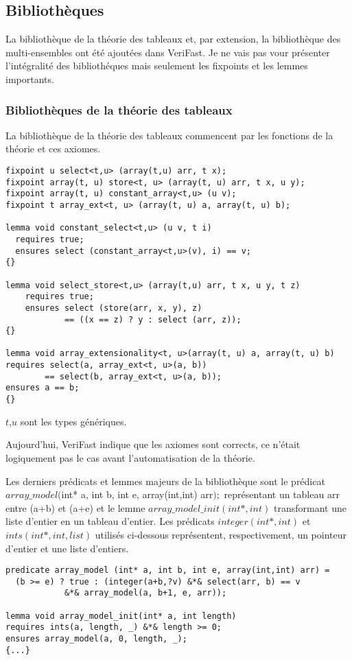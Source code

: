 \documentclass[11pt,openany]{article}
\newcommand{\verifast}{VeriFast}
\begin{document}
	\subsection{Biblioth\`eques}
		La biblioth\`eque de la th\'eorie des tableaux et, par extension, la biblioth\`eque des multi-ensembles ont \'et\'e ajout\'ees dans \verifast. Je ne vais pas vour pr\'esenter l'int\'egralit\'e des biblioth\'eques mais seulement les fixpoints et les lemmes importants.
		\subsubsection{Biblioth\`eques de la th\'eorie des tableaux}
			La biblioth\`eque de la th\'eorie des tableaux commencent par les fonctions de la th\'eorie et ces axiomes.
			\begin{lstlisting}
fixpoint u select<t,u> (array(t,u) arr, t x);
fixpoint array(t, u) store<t, u> (array(t, u) arr, t x, u y);
fixpoint array(t, u) constant_array<t,u> (u v);
fixpoint t array_ext<t, u> (array(t, u) a, array(t, u) b);

lemma void constant_select<t,u> (u v, t i)
  requires true;
  ensures select (constant_array<t,u>(v), i) == v;
{}

lemma void select_store<t,u> (array(t,u) arr, t x, u y, t z)
    requires true;
    ensures select (store(arr, x, y), z) 
    		== ((x == z) ? y : select (arr, z));
{}

lemma void array_extensionality<t, u>(array(t, u) a, array(t, u) b)
requires select(a, array_ext<t, u>(a, b)) 
		== select(b, array_ext<t, u>(a, b));
ensures a == b;
{}
			\end{lstlisting}
			$t$,$u$ sont les types g\'en\'eriques.
			
			Aujourd'hui, \verifast{} indique que les axiomes sont corrects, ce n'\'etait logiquement pas le cas avant l'automatisation de la th\'eorie.
			
			Les derniers pr\'edicats et lemmes majeurs de la biblioth\`eque sont le pr\'edicat $array\_model($int* a, int b, int e, array(int,int) arr$);$ repr\'esentant un tableau arr entre (a+b) et (a+e) et le lemme $array\_model\_init(int*,int)$ transformant une liste d'entier en un tableau d'entier. Les pr\'edicats $integer(int*,int)$ et $ints(int*,int,list)$ utilis\'es ci-dessous repr\'esentent, respectivement, un pointeur d'entier et une liste d'entiers.
			\begin{lstlisting}
predicate array_model (int* a, int b, int e, array(int,int) arr) =
  (b >= e) ? true : (integer(a+b,?v) &*& select(arr, b) == v 
  			&*& array_model(a, b+1, e, arr));
  			
lemma void array_model_init(int* a, int length)
requires ints(a, length, _) &*& length >= 0;
ensures array_model(a, 0, length, _);
{...}

			\end{lstlisting}
			
\end{document}
